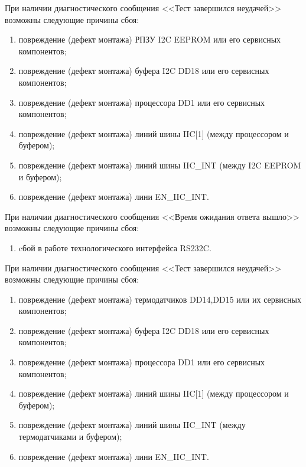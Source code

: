   \begin{sloppypar}
  
    \subpoint При наличии диагностического сообщения <<Тест завершился неудачей>> возможны следующие причины сбоя:
      \begin{enumerate}
	\item повреждение (дефект монтажа) РПЗУ I2C EEPROM или его сервисных компонентов;
	\item повреждение (дефект монтажа) буфера I2C DD18 или его сервисных компонентов;
	\item повреждение (дефект монтажа) процессора DD1 или его сервисных компонентов;
	\item повреждение (дефект монтажа) линий шины IIC[1] (между процессором и буфером);
	\item повреждение (дефект монтажа) линий шины IIC\_INT (между I2C EEPROM и буфером);
	\item повреждение (дефект монтажа) лини EN\_IIC\_INT.
      \end{enumerate}
      
    \subpoint При наличии диагностического сообщения <<Время ожидания ответа вышло>> возможны следующие причины сбоя:
      \begin{enumerate}
	\item cбой в работе технологического интерфейса RS232C.
      \end{enumerate}
  \end{sloppypar}
  
    \subpoint При наличии диагностического сообщения <<Тест завершился неудачей>> возможны следующие причины сбоя:
      \begin{enumerate}
	\item повреждение (дефект монтажа) термодатчиков DD14,DD15 или их сервисных компонентов;
	\item повреждение (дефект монтажа) буфера I2C DD18 или его сервисных компонентов;
	\item повреждение (дефект монтажа) процессора DD1 или его сервисных компонентов;
	\item повреждение (дефект монтажа) линий шины IIC[1] (между процессором и буфером);
	\item повреждение (дефект монтажа) линий шины IIC\_INT (между термодатчиками и буфером);
	\item повреждение (дефект монтажа) лини EN\_IIC\_INT.
      \end{enumerate}
      
